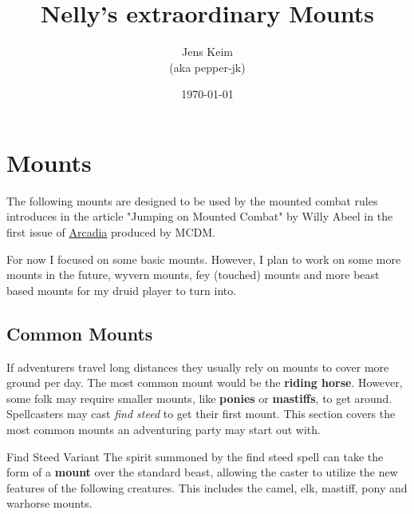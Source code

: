 \documentclass[letterpaper,twocolumn,openany,nodeprecatedcode]{dndbook}
\title{Nelly's extraordinary Mounts}
\author{Jens Keim\\(aka pepper-jk)}
\date{\today}
\begin{document}
\frontmatter

\maketitle

\tableofcontents

\mainmatter

\chapter{Mounts}

The following mounts are designed to be used by the mounted combat rules introduces in the article "Jumping on Mounted Combat" by Willy Abeel in the first issue of \href{https://www.youtube.com/watch?v=oid4QMMXjfs}{Arcadia} produced by MCDM.

For now I focused on some basic mounts. However, I plan to work on some more mounts in the future, wyvern mounts, fey (touched) mounts and more beast based mounts for my druid player to turn into.

\section{Common Mounts}

If adventurers travel long distances they usually rely on mounts to cover more ground per day.
The most common mount would be the \textbf{riding horse}.
However, some folk may require smaller mounts, like \textbf{ponies} or \textbf{mastiffs}, to get around.
Spellcasters may cast \textit{find steed} to get their first mount.
This section covers the most common mounts an adventuring party may start out with.

\begin{DndComment}{Find Steed Variant}
    The spirit summoned by the find steed spell can take the form of a \textbf{mount} over the standard beast, allowing the caster to utilize the new features of the following creatures. This includes the camel, elk, mastiff, pony and warhorse mounts.
\end{DndComment}
\end{document}
